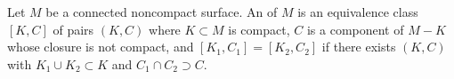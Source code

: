 Let $M$ be a connected noncompact surface. An  of $M$ is an equivalence class $[K, C]$ of pairs $(K, C)$ where $K \subset M$ is compact, $C$ is a component of $M - K$ whose closure is not compact, and $[K_1, C_1] = [K_2, C_2]$ if there exists $(K, C)$ with $K_1 \cup K_2 \subset K$ and $C_1 \cap C_2 \supset C$.
